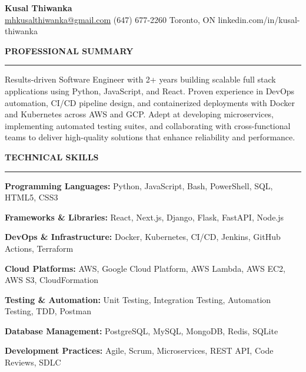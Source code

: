 \documentclass[10pt,letterpaper]{article}
\begin{document}
\begin{center}
{\LARGE\textbf{Kusal Thiwanka}}\\[3pt]
\href{mailto:mhkusalthiwanka@gmail.com}{mhkusalthiwanka@gmail.com}\hspace{2em}%
(647) 677{-}2260\hspace{2em}%
Toronto, ON\hspace{2em}
linkedin.com/in/kusal-thiwanka
\end{center}

\vspace{6pt}

\textbf{PROFESSIONAL SUMMARY}\\[-8pt]
\noindent\rule{\textwidth}{1pt}

\vspace{-2pt}

Results-driven Software Engineer with 2+ years building scalable full stack applications using Python, JavaScript, and React. Proven experience in DevOps automation, CI/CD pipeline design, and containerized deployments with Docker and Kubernetes across AWS and GCP. Adept at developing microservices, implementing automated testing suites, and collaborating with cross-functional teams to deliver high-quality solutions that enhance reliability and performance.

\vspace{8pt}

\textbf{TECHNICAL SKILLS}\\[-8pt]
\noindent\rule{\textwidth}{1pt}

\vspace{-2pt}

\textbf{Programming Languages:} Python, JavaScript, Bash, PowerShell, SQL, HTML5, CSS3

\textbf{Frameworks \& Libraries:} React, Next.js, Django, Flask, FastAPI, Node.js

\textbf{DevOps \& Infrastructure:} Docker, Kubernetes, CI/CD, Jenkins, GitHub Actions, Terraform

\textbf{Cloud Platforms:} AWS, Google Cloud Platform, AWS Lambda, AWS EC2, AWS S3, CloudFormation

\textbf{Testing \& Automation:} Unit Testing, Integration Testing, Automation Testing, TDD, Postman

\textbf{Database Management:} PostgreSQL, MySQL, MongoDB, Redis, SQLite

\textbf{Development Practices:} Agile, Scrum, Microservices, REST API, Code Reviews, SDLC
\end{document}
